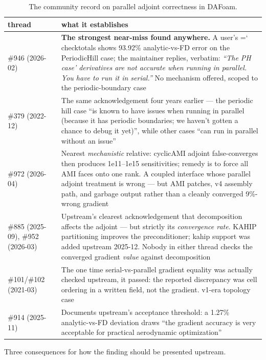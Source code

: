 \documentclass[11pt,a4paper]{article}
\newcommand{\artifact}[1]{{\small\ttfamily\hyphenchar\font=`\-\relax
  \def\_{\textunderscore\allowbreak}#1}}
\begin{document}
\begin{table}[htbp]
\centering\small
\begin{tabular}{@{}lL{10.6cm}@{}}
\toprule
thread & what it establishes \\
\midrule
\#946 (2026-02) & \textbf{The strongest near-miss found anywhere.} A user's \artifact{check\_totals} shows 93.92\% analytic-vs-FD error on the PeriodicHill case; the maintainer replies, verbatim: \emph{``The PH case' derivatives are not accurate when running in parallel. You have to run it in serial.''} No mechanism offered, scoped to the periodic-boundary case \\
\#379 (2022-12) & The same acknowledgement four years earlier --- the periodic hill case ``is known to have issues when running in parallel (because it has periodic boundaries; we haven't gotten a chance to debug it yet)'', while other cases ``can run in parallel without an issue'' \\
\#972 (2026-04) & Nearest \emph{mechanistic} relative: cyclicAMI adjoint false-converges then produces 1e11--1e15 sensitivities; remedy is to force all AMI faces onto one rank. A coupled interface whose parallel adjoint treatment is wrong --- but AMI patches, v4 assembly path, and garbage output rather than a cleanly converged 9\%-wrong gradient \\
\#885 (2025-09), \#952 (2026-03) & Upstream's clearest acknowledgement that decomposition affects the adjoint --- but strictly its \emph{convergence rate}. KAHIP partitioning improves the preconditioner; kahip support was added upstream 2025-12. Nobody in either thread checks the converged gradient \emph{value} against decomposition \\
\#101/\#102 (2021-03) & The one time serial-vs-parallel gradient equality was actually checked upstream, it passed: the reported discrepancy was cell ordering in a written field, not the gradient. v1-era topology case \\
\#914 (2025-11) & Documents upstream's acceptance threshold: a 1.27\% analytic-vs-FD deviation draws ``the gradient accuracy is very acceptable for practical aerodynamic optimization'' \\
\bottomrule
\end{tabular}
\caption{The community record on parallel adjoint correctness in DAFoam.}
\end{table}

Three consequences for how the finding should be presented upstream.
\end{document}
